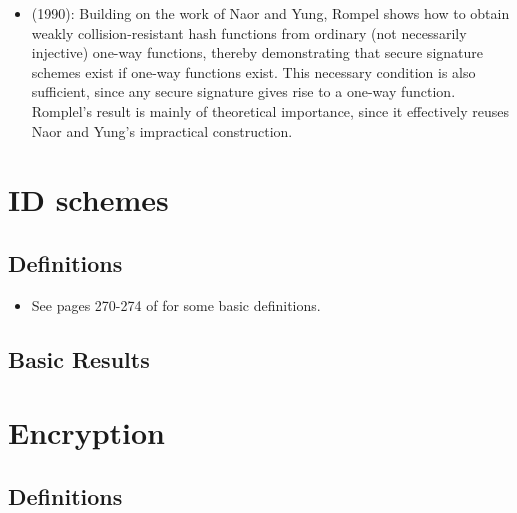 \begin{itemize}
\item \cite{rompel:1waysigs} (1990): Building on the work of Naor and Yung, Rompel
shows how to obtain weakly collision-resistant hash functions from ordinary (not necessarily injective)
one-way functions, thereby demonstrating that secure signature
schemes exist if one-way functions exist. This necessary condition is also
sufficient, since any secure signature gives rise to a one-way function.
Romplel's result is mainly of theoretical importance, since it effectively
reuses Naor and Yung's impractical construction.
\end{itemize}


\section{ID schemes}
\subsection{Definitions}
\begin{itemize}
\item See pages 270-274 of \cite{goldreich:foundations1} for some basic definitions.
\end{itemize}

\subsection{Basic Results}

\section{Encryption}

\subsection{Definitions}
